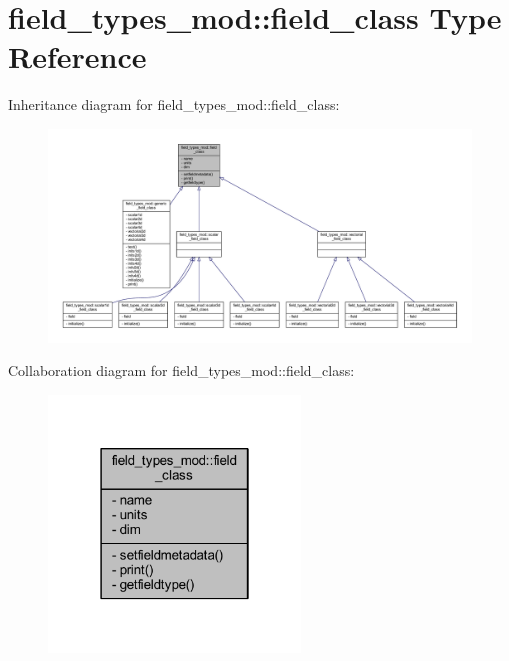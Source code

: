 \hypertarget{structfield__types__mod_1_1field__class}{}\section{field\+\_\+types\+\_\+mod\+:\+:field\+\_\+class Type Reference}
\label{structfield__types__mod_1_1field__class}


Inheritance diagram for field\+\_\+types\+\_\+mod\+:\+:field\+\_\+class\+:\nopagebreak
\begin{figure}[H]
\begin{center}
\leavevmode
\includegraphics[width=350pt]{structfield__types__mod_1_1field__class__inherit__graph}
\end{center}
\end{figure}


Collaboration diagram for field\+\_\+types\+\_\+mod\+:\+:field\+\_\+class\+:\nopagebreak
\begin{figure}[H]
\begin{center}
\leavevmode
\includegraphics[width=190pt]{structfield__types__mod_1_1field__class__coll__graph}
\end{center}
\end{figure}
